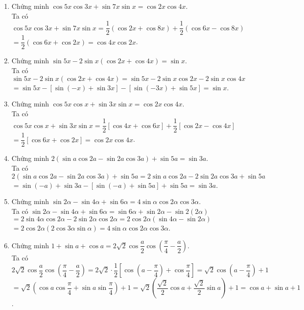 \begin{bt}
{		\begin{enumerate}
			\item Chứng minh $\cos 5x\cos 3x+\sin 7x\sin x=\cos 2x\cos 4x$.\\
			Ta có $\cos 5x\cos 3x+\sin 7x\sin x=\dfrac{1}{2}\left(\cos 2x+\cos 8x\right)+\dfrac{1}{2}\left(\cos 6x-\cos 8x\right)$ \\ 
			$=\dfrac{1}{2}\left(\cos 6x+\cos 2x\right)=\cos 4x\cos 2x$.
			\item Chứng minh $\sin 5x-2\sin x(\cos 2x+\cos 4x)=\sin x$.\\
			Ta có $\sin 5x-2\sin x(\cos 2x+\cos 4x)=\sin 5x-2\sin x\cos 2x-2\sin x\cos 4x$ \\ 
			$=\sin 5x-\left[\sin (-x)+\sin 3x\right]-\left[\sin (-3x)+\sin 5x\right]=\sin x$.
			\item Chứng minh $\cos 5x\cos x+\sin 3x\sin x=\cos 2x\cos 4x$.\\
			Ta có $\cos 5x\cos x+\sin 3x\sin x=\dfrac{1}{2}\left[\cos 4x+\cos 6x\right]+\dfrac{1}{2}\left[\cos 2x-\cos 4x\right]$ \\ 
			$=\dfrac{1}{2}\left[\cos 6x+\cos 2x\right]=\cos 2x\cos 4x$.
			\item Chứng minh $2(\sin a\cos 2a-\sin 2a\cos 3a)+\sin 5a=\sin 3a$.\\
			Ta có $2(\sin a\cos 2a-\sin 2a\cos 3a)+\sin 5a=2\sin a\cos 2a-2\sin 2a\cos 3a+\sin 5a$ \\ 
			$=\sin (-a)+\sin 3a-\left[\sin (-a)+\sin 5a\right]+\sin 5a=\sin 3a$.
			\item Chứng minh $\sin 2\alpha -\sin 4\alpha +\sin 6\alpha =4\sin \alpha \cos 2\alpha \cos 3\alpha $.\\
			Ta có $\sin 2\alpha -\sin 4\alpha +\sin 6\alpha =\sin 6\alpha +\sin 2\alpha -\sin 2\left(2\alpha \right)$ \\ 
			$=2\sin 4\alpha \cos 2\alpha -2\sin 2\alpha \cos 2\alpha =2\cos 2\alpha \left(\sin 4\alpha -\sin 2\alpha \right)$ \\ 
			$=2\cos 2\alpha \left(2\cos 3\alpha\sin \alpha \right)=4\sin \alpha \cos 2\alpha \cos 3\alpha $.
			\item Chứng minh $1+\sin a+\cos a=2\sqrt{2}\cos \dfrac{a}{2}\cos \left(\dfrac{\pi}{4}-\dfrac{a}{2}\right)$. \\
			Ta có $2\sqrt{2}\cos \dfrac{a}{2}\cos \left(\dfrac{\pi}{4}-\dfrac{a}{2}\right)=2\sqrt{2}\cdot \dfrac{1}{2}\left[\cos \left(a-\dfrac{\pi}{4}\right)+\cos \dfrac{\pi}{4}\right]=\sqrt{2}\cos \left(a-\dfrac{\pi}{4}\right)+1$ \\
			$=\sqrt{2}\left(\cos a\cos \dfrac{\pi}{4}+\sin a\sin \dfrac{\pi}{4}\right)+1=\sqrt{2}\left(\dfrac{\sqrt{2}}{2}\cos a+\dfrac{\sqrt{2}}{2}\sin a\right)+1=\cos a+\sin a+1$.

\end{enumerate}}
\end{bt}

